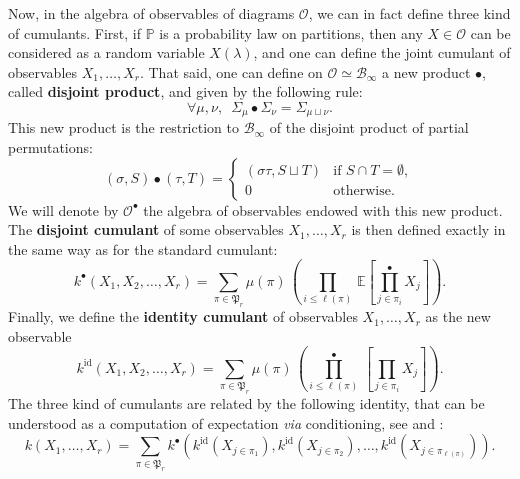\documentclass[smallextended,nospthms]{svjour3}
\theoremstyle{remark}
\newcommand{\setpart}{\mathfrak{P}}
\newcommand{\proba}{\mathbb{P}}
\newcommand{\esper}{\mathbb{E}}
\newcommand{\obs}{\mathscr{O}}
\newcommand{\blg}{\mathscr{B}}
\newcommand{\id}{\mathrm{id}}
\begin{document}
Now, in the algebra of observables of diagrams $\obs$, we can in fact define three kind of cumulants. First, if $\proba$ is a probability law on partitions, then any $X \in \obs$ can be considered as a random variable $X(\lambda)$, and one can define the joint cumulant of observables $X_{1},\ldots,X_{r}$. That said, one can define on $\obs \simeq \blg_{\infty}$ a new product $\bullet$, called \textbf{disjoint product}, and given by the following rule:
$$\forall \mu,\nu,\,\,\,\varSigma_{\mu}\bullet \varSigma_{\nu}=\varSigma_{\mu\sqcup \nu}.$$
This new product is the restriction to $\blg_{\infty}$ of the disjoint product of partial permutations:
$$(\sigma,S)\bullet (\tau,T)=\begin{cases}(\sigma\tau,S\sqcup T)&\text{if }S\cap T=\emptyset,\\
0&\text{otherwise}.
\end{cases}$$
We will denote by $\obs^{\bullet}$ the algebra of observables endowed with this new product. The \textbf{disjoint cumulant} of some observables $X_{1},\ldots,X_{r}$ is then defined exactly in the same way as for the standard cumulant:
$$k^{\bullet}(X_{1},X_{2},\ldots,X_{r})=\sum_{\pi \in \setpart_{r}} \mu(\pi) \,\left(\prod_{i\leq \ell(\pi)}\,\esper\!\left[\prod_{j \in \pi_{i}}^{\bullet} X_{j}\right]\right).$$
Finally, we define the \textbf{identity cumulant} of observables $X_{1},\ldots,X_{r}$ as the new observable 
$$k^{\id} (X_{1},X_{2},\ldots,X_{r})=\sum_{\pi \in \setpart_{r}} \mu(\pi) \,\left(\prod_{i \leq \ell(\pi)}^{\bullet}\,\left[\prod_{j \in \pi_{i}} X_{j}\right]\right).$$
The three kind of cumulants are related by the following identity, that can be understood as a computation of expectation \emph{via} conditioning, see \cite{Bri69} and \cite[Lemma 4.8]{Sni06b}:
$$k(X_{1},\ldots,X_{r})=\sum_{\pi \in \setpart_{r}} k^{\bullet}\left(k^{\id}(X_{j \in \pi_{1}}),k^{\id}(X_{j \in \pi_{2}}),\ldots,k^{\id}(X_{j \in \pi_{\ell(\pi)}})\right).$$\bigskip
\bigskip
\end{document}
